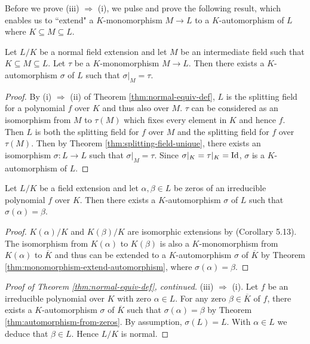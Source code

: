 Before we prove (iii) $\Rightarrow$ (i), we pulse and prove the following result, which enables us to ``extend" a $K$-monomorphism $M \to L$ to a $K$-automorphism of $L$ where $K \subseteq M \subseteq L$. 

\begin{theorem} \label{thm:monomorphism-extend-automorphism}
	Let $L/K$ be a normal field extension and let $M$ be an intermediate field such that $K \subseteq M \subseteq L$. Let $\tau$ be a $K$-monomorphism $M \to L$. Then there exists a $K$-automorphism $\sigma$ of $L$ such that $\sigma | _M = \tau$.  
\end{theorem}

\begin{proof}
	By (i) $\Rightarrow$ (ii) of Theorem \ref{thm:normal-equiv-def}, $L$ is the splitting field for a polynomial $f$ over $K$ and thus also over $M$. $\tau$ can be considered as an isomorphism from $M$ to $\tau(M)$ which fixes every element in $K$ and hence $f$. Then $L$ is both the splitting field for $f$ over $M$ and the splitting field for $f$ over $\tau(M)$. Then by Theorem \ref{thm:splitting-field-unique}, there exists an isomorphism $\sigma: L \to L$ such that $\sigma | _M = \tau$. Since $\sigma | _K = \tau |_K = \operatorname{Id}$, $\sigma$ is a $K$-automorphism of $L$. 
\end{proof}

\begin{theorem} \label{thm:automorphism-from-zeros}
    Let $L/K$ be a field extension and let $\alpha, \beta \in L$ be zeros of an irreducible polynomial $f$ over $K$. Then there exists a $K$-automorphism $\sigma$ of $L$ such that $\sigma(\alpha) = \beta$. 
\end{theorem}

\begin{proof}
     $K(\alpha)/K$ and $K(\beta)/K$ are isomorphic extensions by \TODO(Corollary 5.13). The isomorphism from $K(\alpha)$ to $K(\beta)$ is also a $K$-monomorphism from $K(\alpha)$ to $\overline K$ and thus can be extended to a $K$-automorphism $\sigma$ of $\overline K$ by Theorem \ref{thm:monomorphism-extend-automorphism}, where $\sigma(\alpha) = \beta$.
\end{proof}

\begin{proof}[Proof of Theorem \ref{thm:normal-equiv-def}, continued]
	    (iii) $\Rightarrow$ (i). Let $f$ be an irreducible polynomial over $K$ with zero $\alpha \in L$. For any zero $\beta \in \overline K$ of $f$, there exists a $K$-automorphism $\sigma$ of $\overline K $ such that $\sigma(\alpha) = \beta$ by Theorem \ref{thm:automorphism-from-zeros}. By assumption, $\sigma(L) = L$. With $\alpha \in L$ we deduce that $\beta \in L$. Hence $L/K$ is normal.
\end{proof}


